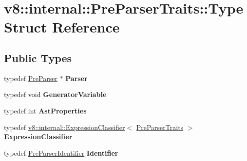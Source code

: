 \hypertarget{structv8_1_1internal_1_1_pre_parser_traits_1_1_type}{}\section{v8\+:\+:internal\+:\+:Pre\+Parser\+Traits\+:\+:Type Struct Reference}
\label{structv8_1_1internal_1_1_pre_parser_traits_1_1_type}
\subsection*{Public Types}
\begin{DoxyCompactItemize}
\item 
typedef \hyperlink{classv8_1_1internal_1_1_pre_parser}{Pre\+Parser} $\ast$ {\bfseries Parser}\hypertarget{structv8_1_1internal_1_1_pre_parser_traits_1_1_type_a2ef3e48d99f0d01c4e680be56164cfea}{}\label{structv8_1_1internal_1_1_pre_parser_traits_1_1_type_a2ef3e48d99f0d01c4e680be56164cfea}

\item 
typedef void {\bfseries Generator\+Variable}\hypertarget{structv8_1_1internal_1_1_pre_parser_traits_1_1_type_afb23ca9cefc60e38846e15de184d5f47}{}\label{structv8_1_1internal_1_1_pre_parser_traits_1_1_type_afb23ca9cefc60e38846e15de184d5f47}

\item 
typedef int {\bfseries Ast\+Properties}\hypertarget{structv8_1_1internal_1_1_pre_parser_traits_1_1_type_a1f4f085fcded5b7a5463e24f416e2515}{}\label{structv8_1_1internal_1_1_pre_parser_traits_1_1_type_a1f4f085fcded5b7a5463e24f416e2515}

\item 
typedef \hyperlink{classv8_1_1internal_1_1_expression_classifier}{v8\+::internal\+::\+Expression\+Classifier}$<$ \hyperlink{classv8_1_1internal_1_1_pre_parser_traits}{Pre\+Parser\+Traits} $>$ {\bfseries Expression\+Classifier}\hypertarget{structv8_1_1internal_1_1_pre_parser_traits_1_1_type_ad9e14ad94d0ee546edaac475f30a08ac}{}\label{structv8_1_1internal_1_1_pre_parser_traits_1_1_type_ad9e14ad94d0ee546edaac475f30a08ac}

\item 
typedef \hyperlink{classv8_1_1internal_1_1_pre_parser_identifier}{Pre\+Parser\+Identifier} {\bfseries Identifier}\hypertarget{structv8_1_1internal_1_1_pre_parser_traits_1_1_type_ad3d00083fc28917ff270399d8d8bf119}{}\label{structv8_1_1internal_1_1_pre_parser_traits_1_1_type_ad3d00083fc28917ff270399d8d8bf119}


\end{DoxyCompactItemize}
